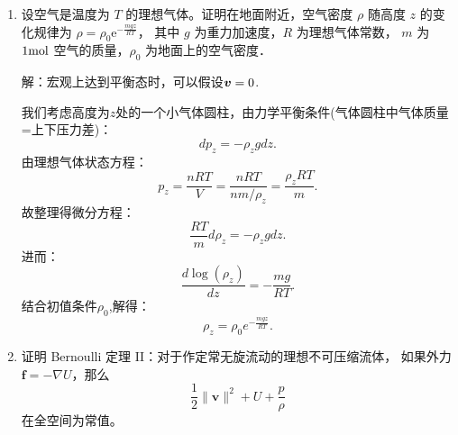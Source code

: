 \begin{enumerate}
    解：$\Omega$内总能量：
    $$\int_{\Omega}(\rho e+\frac12\|\v\|^2)dV,$$
    $[t_1,t_2]$从$\partial\Omega$流出的能量(分为流出流体的能量和热传导出去的能量)：
    $$\int_{t_1}^{t_2}\int_{\Omega}\rho \v(e+\frac12\|\v\|^2)\cdot \n dSdt+\int_{t_1}^{t_2}\int_{\partial\Omega}\q\cdot\n dSdt,$$
    $[t_1,t_2]$所有力(包括外力和压强)：
    $$\int_{t_1}^{t_2}\int_{\Omega}\rho \f\cdot\v+\int_{t_1}^{t_2}\int_{\partial\Omega}(-p\n)\cdot \v dSdt. $$
    因此由能量守恒，有：
    $$\int_{\Omega}(\rho e+\frac12\|\v\|^2)dV|_{t_1}^{t_2}
    =-\left[\int_{t_1}^{t_2}\int_{\Omega}\rho \v(e+\frac12\|\v\|^2)\cdot \n dSdt
    +\int_{t_1}^{t_2}\int_{\partial\Omega}\q\cdot\n dSdt\right]
    +\left[\int_{t_1}^{t_2}\int_{\Omega}\rho \f\cdot\v
    +\int_{t_1}^{t_2}\int_{\partial\Omega}(-p\n)\cdot \v dSdt\right]$$
    由Gauss公式，化简得：
    $$\frac{\partial}{\partial t}\left(\rho(e+\frac12 v_iv_i)\right)
    +\frac{\partial}{\partial{x_j}}(pv_j)-\rho f_iv_i+\frac{\partial{q_i}}{\partial{x_i}}
    +\frac{\partial}{\partial{x_j}}\left(\rho v_j(e+\frac12 v_iv_i)\right)=0.$$
    即得理想流体的能量方程：
    $$\frac{\partial}{\partial{t}}\left(\rho(e+\frac12 \|v\|^2)\right)
    +\frac{\partial}{\partial{x_j}}\left(\rho v_j(e+\frac12 \|v\|^2)+pv_j\right)
    =\rho f_iv_i-\frac{\partial{q_i}}{\partial{x_i}}.$$

    \item 设空气是温度为 $T$ 的理想气体。证明在地面附近，空气密度 $\rho$ 随高度 $z$ 的变化规律为 
    $\rho=\rho_0 \mathrm{e}^{-\frac{m g z}{R T}}$，
    其中 $g$ 为重力加速度，$R$ 为理想气体常数，
    $m$ 为 $1 {\rm mol}$ 空气的质量，$\rho_0$ 为地面上的空气密度．

    解：宏观上达到平衡态时，可以假设$\boldsymbol{v}=0$.

    我们考虑高度为$z$处的一个小气体圆柱，由力学平衡条件(气体圆柱中气体质量=上下压力差)：
    $$dp_z=-\rho_z gdz.$$
    由理想气体状态方程：
    $$p_z=\frac{nRT}{V}=\frac{nRT}{nm/\rho_z}=\frac{\rho_z RT}{m}.$$
    故整理得微分方程：
    $$\frac{RT}{m}d\rho_z=-\rho_z gdz.$$
    进而：
    $$\frac{d\log(\rho_z)}{dz}=-\frac{mg}{RT}.$$
    结合初值条件$\rho_0$,解得：
    $$\rho_z=\rho_0 e^{-\frac{mgz}{RT}}.$$

    \item 证明 Bernoulli 定理 II：对于作定常无旋流动的理想不可压缩流体，
    如果外力 $\boldsymbol{f}=-\nabla U$，那么
    $$\frac{1}{2}\|\boldsymbol{v}\|^2+U+\frac{p}{\rho}$$
    在全空间为常值。


\end{enumerate}
